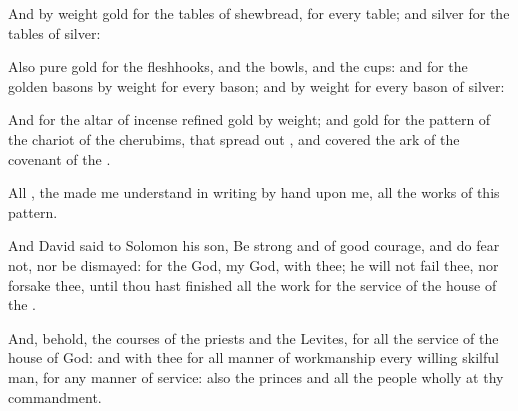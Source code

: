 {And by
weight
{}
gold for the
tables of
shewbread, for every
table; and
{}
silver for the
tables of
silver:

Also
pure
gold for the
fleshhooks, and the
bowls, and the
cups: and for the
golden
basons
{} by
weight for every
bason; and
{} by
weight for every
bason of
silver:

And for the
altar of
incense
refined
gold by
weight; and
gold for the
pattern of the
chariot of the
cherubims, that spread
out
{}, and
covered the
ark of the
covenant of the
{}.

All
{}, the
{} made me
understand in
writing by
{}
hand upon me,
{} all the
works of this
pattern.

And
David
said to
Solomon his
son, Be
strong and of good
courage, and
do
{}
fear not, nor be
dismayed: for the
{}
God,
{} my
God,
{} with thee; he will not
fail thee, nor
forsake thee, until thou hast
finished all the
work for the
service of the
house of the
{}.

And, behold, the
courses of the
priests and the
Levites,
{} for all the
service of the
house of
God: and
{} with thee for all manner of
workmanship every
willing skilful
man, for any manner of
service: also the
princes and all the
people
{} wholly at thy
commandment.




\par }
